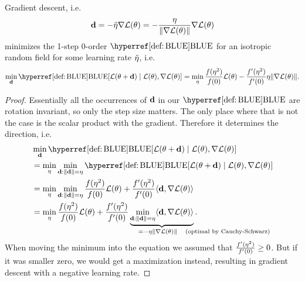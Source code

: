 \begin{corollary}
	Gradient descent, i.e.
	\begin{equation*}
		\mathbf{d} = - \tilde{\eta} \nabla\mathcal{L}(\theta)
		= - \frac{\eta}{\|\nabla\mathcal{L}(\theta)\|} \nabla\mathcal{L}(\theta)
	\end{equation*}
	minimizes the 1-step 0-order \(\BLUE\) for an isotropic random
	field for some learning rate \(\tilde{\eta}\), i.e.
	\begin{equation*}
		\min_{\step}
		\BLUE[\Loss(\param + \step)\mid \Loss(\param), \nabla\Loss(\param)]
		= \min_{\lr} \frac{f(\lr^2)}{f(0)} \Loss(\param)
		- \frac{f'(\lr^2)}{f'(0)} \lr \|\nabla\Loss(\param)\|.
	\end{equation*}
\end{corollary}
\begin{proof}
	Essentially all the occurrences of \(\mathbf{d}\) in our \(\BLUE\) are
	rotation invariant, so only the step size matters. The only place where that
	is not the case is the scalar product with the gradient. Therefore it
	determines the direction, i.e.
	\begin{align*}
		&\min_{\step}
		\BLUE[\Loss(\param + \step)\mid \Loss(\param), \nabla\Loss(\param)]\\
		&= \min_{\lr}\min_{\step:\|\step\|=\lr}
		\BLUE[\Loss(\param + \step)\mid \Loss(\param), \nabla\Loss(\param)]\\
		&= \min_{\lr}\min_{\step:\|\step\|=\lr}
		\frac{f(\lr^2)}{f(0)} \Loss(\param)
		+ \frac{f'(\lr^2)}{f'(0)} \langle \step, \nabla\Loss(\param)\rangle\\
		&= \min_{\lr}
		\frac{f(\lr^2)}{f(0)} \Loss(\param)
		+ \frac{f'(\lr^2)}{f'(0)}
		\underbrace{\min_{\step:\|\step\|=\lr}\langle \step, \nabla\Loss(\param)\rangle}_{
			= -\eta \|\nabla \Loss(\param)\| \quad \mathrlap{\text{(optimal by Cauchy-Schwarz)}}
		}.\hphantom{\text{by Cauchy-Schwarz}}
	\end{align*}
	When moving the minimum into the equation we assumed that
	\(\frac{f'(\eta^2)}{f'(0)}\ge 0\). But if it was smaller zero, we would get a
	maximization instead, resulting in gradient descent with a negative learning
	rate.
\end{proof}




